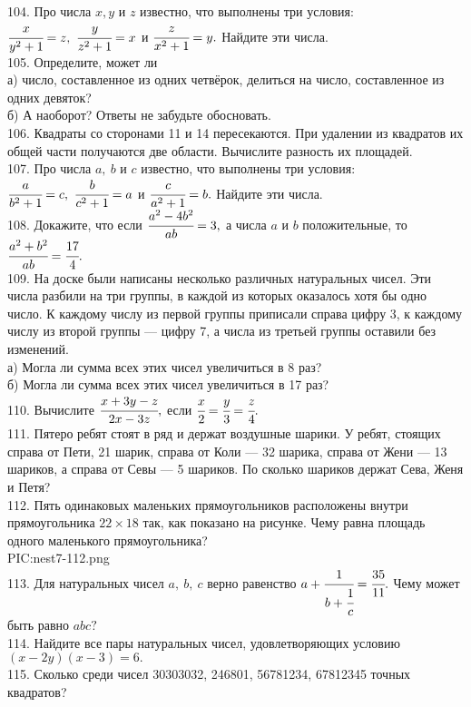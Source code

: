 104. Про числа $x, y$ и $z$ известно, что выполнены три условия: $\cfrac{x}{y^2+1}=z,\ \cfrac{y}{z^2+1}=x$ и $\cfrac{z}{x^2+1}=y.$ Найдите эти числа.\\
105. Определите, может ли\\
а) число, составленное из одних четвёрок, делиться на число, составленное из одних девяток?\\
б) А наоборот? Ответы не забудьте обосновать.\\
106. Квадраты со сторонами 11 и 14 пересекаются. При удалении из квадратов их общей части получаются две области. Вычислите разность их площадей.\\
107. Про числа $a,\ b$ и $c$ известно, что выполнены три условия: $\cfrac{a}{b^2+1}=c,\ \cfrac{b}{c^2+1}=a$ и $\cfrac{c}{a^2+1}=b.$ Найдите эти числа.\\
108. Докажите, что если $\cfrac{a^2-4b^2}{ab}=3,$ а числа $a$ и $b$ положительные, то $\cfrac{a^2+b^2}{ab}=\cfrac{17}{4}.$\\
109. На доске были написаны несколько различных натуральных чисел. Эти числа разбили на три группы, в каждой из которых оказалось хотя бы одно число.
К каждому числу из первой группы приписали справа цифру 3, к каждому числу из второй группы --- цифру 7, а числа из третьей группы оставили без изменений.\\
а) Могла ли сумма всех этих чисел увеличиться в 8 раз?\\
б) Могла ли сумма всех этих чисел увеличиться в 17 раз?\\
110. Вычислите $\cfrac{x+3y-z}{2x-3z},$ если $\cfrac{x}{2}=\cfrac{y}{3}=\cfrac{z}{4}.$\\
111. Пятеро ребят стоят в ряд и держат воздушные шарики. У ребят, стоящих справа от Пети, 21 шарик, справа от Коли --- 32 шарика, справа от Жени --- 13 шариков, а справа от Севы --- 5 шариков. По сколько шариков держат Сева, Женя и Петя?\\
112. Пять одинаковых маленьких прямоугольников расположены внутри прямоугольника $22\times18$ так, как показано на рисунке. Чему равна площадь одного маленького прямоугольника?\\
{{PIC:nest7-112.png}}\\
113. Для натуральных чисел $a,\ b,\ c$ верно равенство $a+\cfrac{1}{b+\cfrac{1}{c}}=\cfrac{35}{11}.$ Чему может быть равно $abc?$\\
114. Найдите все пары натуральных чисел, удовлетворяющих условию $(x-2y)(x-3)=6.$\\
115. Сколько среди чисел 30303032, 246801, 56781234, 67812345 точных квадратов?\\

